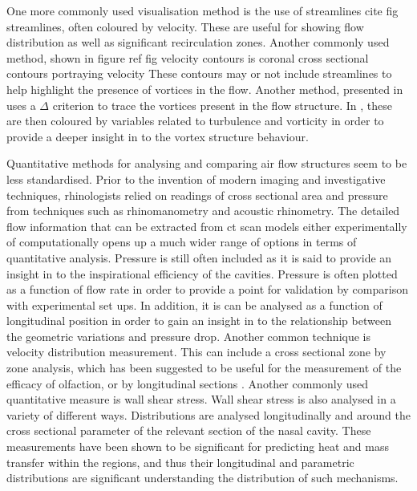 \documentclass{article}
\begin{document}
One more commonly used visualisation method is the use of streamlines cite fig streamlines, often coloured by velocity\cite{Wen2008, Zhu2011, Garcia2007}. These are useful for showing flow distribution as well as significant recirculation zones\cite{Lintermann2013, Xi2014}. Another commonly used method, shown in figure ref fig velocity contours is coronal cross sectional contours portraying velocity These contours may or not include streamlines to help highlight the presence of vortices in the flow\cite{Wen2008}. Another method, presented in \cite{Lintermann2013} uses a $\Delta $ criterion to trace the vortices present in the flow structure. In \cite{Lintermann2013}, these are then coloured by variables related to turbulence and vorticity in order to provide a deeper insight in to the vortex structure behaviour.

Quantitative methods for analysing and comparing air flow structures seem to be less standardised. Prior to the invention of modern imaging and investigative techniques, rhinologists relied on readings of cross sectional area and pressure from techniques such as rhinomanometry and acoustic rhinometry\cite{Doorly2008c}. The detailed flow information that can be extracted from ct scan models either experimentally of computationally opens up a much wider range of options in terms of quantitative analysis. Pressure is still often included as it is said to provide an insight in to the inspirational efficiency of the cavities\cite{Lintermann2013}. Pressure is often plotted as a function of flow rate in order to provide a point for validation by comparison with experimental set ups\cite{Wen2008, Inthavong2014}. In addition, it is can be analysed as a function of longitudinal position in order to gain an insight in to the relationship between the geometric variations and pressure drop\cite{Lintermann2013}. Another common technique is velocity distribution measurement\cite{Keyhani1995, Zhu2011, Lintermann2013}. This can include a cross sectional zone by zone analysis\cite{Keyhani1995, Zhu2011}, which has been suggested to be useful for the measurement of the efficacy of olfaction\cite{Zhu2011}, or by longitudinal sections\cite{Lintermann2013,Taylor2010} . Another commonly used quantitative measure is wall shear stress. Wall shear stress is also analysed in a variety of different ways. Distributions are analysed longitudinally\cite{Wen2008} and around the cross sectional parameter of the relevant section of the nasal cavity\cite{Burgos2014}. These measurements have been shown to be significant for predicting heat and mass transfer within the regions\cite{Taylor2010}, and thus their longitudinal and parametric distributions are significant understanding the distribution of such mechanisms.
\end{document}

